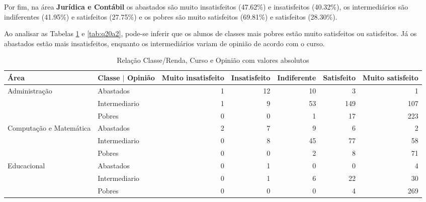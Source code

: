 \documentclass[10pt,a4paper,oneside]{article}
\begin{document}
Por fim, na área \textbf{Jurídica e Contábil} os abastados são muito insatisfeitos (47.62\%) e insatisfeitos (40.32\%), os intermediários são indiferentes (41.95\%) e satisfeitos (27.75\%) e os 
pobres são muito satisfeitos (69.81\%) e satisfeitos (28.30\%).

Ao analisar as Tabelas \ref{tab:q20a1} e \ref{tab:q20a2}, pode-se inferir que os alunos de classes mais pobres estão muito satisfeitos ou satisfeitos. Já os abastados estão mais insatisfeitos, enquanto os 
intermediários variam de opinião de acordo com o curso.

\begin{table}[ht]
\scriptsize
\centering
\caption{Relação Classe/Renda, Curso e Opinião com valores absolutos}
\label{tab:q20a1}
\begin{tabular}{ll rrrrr}
  \toprule
 Área                    & Classe $\vert$ Opinião & \multicolumn{1}{l}{ Muito insatisfeito} & \multicolumn{1}{l}{ Insatisfeito} & \multicolumn{1}{l}{ Indiferente} & \multicolumn{1}{l}{ Satisfeito} & 
\multicolumn{1}{l}{ Muito satisfeito} \\ 
   \midrule
Administração           & Abastados               &                  1 &           12 &          10 &          3 &                1 \\ 
                          & Intermediario           &                  1 &            9 &          53 &        149 &              107 \\ 
                          & Pobres                  &                  0 &            0 &           1 &         17 &              223 \\ 
  Computação e Matemática & Abastados               &                  2 &            7 &           9 &          6 &                2 \\ 
                          & Intermediario           &                  0 &            8 &          45 &         77 &               58 \\ 
                          & Pobres                  &                  0 &            0 &           2 &          8 &               71 \\ 
  Educacional             & Abastados               &                  0 &            1 &           0 &          0 &                4 \\ 
                          & Intermediario           &                  0 &            1 &           6 &         22 &               30 \\ 
                          & Pobres                  &                  0 &            0 &           0 &          4 &              269 \\ 

\end{tabular}
\end{table}
\end{document}
